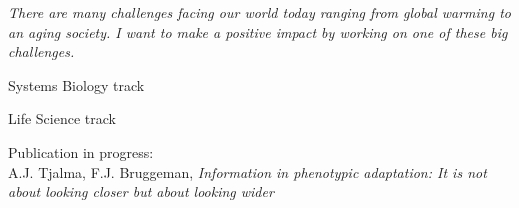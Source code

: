 \textcolor{VividPurple}{\emph{There are many challenges facing our world today ranging from global warming to an aging society. I want to make a positive impact by working on one of these big challenges.}}

{}
{}



Systems Biology track

\divider

Life Science track

Publication in progress: \\ A.J. Tjalma, F.J. Bruggeman, \textit{Information in phenotypic adaptation: It is not about
looking closer but about looking wider}


{}

%
%
%

